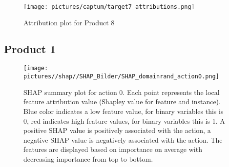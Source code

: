\begin{figure}[H]
    \centering
    \texttt{[image: pictures/captum/target7\_attributions.png]}
    \caption{Attribution plot for Product 8}
    \label{fig:appenidix_agg8_Captum}
\end{figure}

\label{Appendix_SHAP}
\subsection{Product 1}


\begin{figure}[H]
    \centering
    \texttt{[image: pictures//shap//SHAP\_Bilder/SHAP\_domainrand\_action0.png]}
    \caption{SHAP summary plot for action 0.
        Each point represents the local feature attribution value (Shapley value for feature and instance).
        Blue color indicates a low feature value, for binary variables this is 0, red indicates high feature values, for binary variables this is 1. A positive SHAP value is positively associated with the action, a negative SHAP value is negatively associated with the action. The features are displayed based on importance on average with decreasing importance from top to bottom.}
    \label{fig:SHAP_Action0}
\end{figure}


